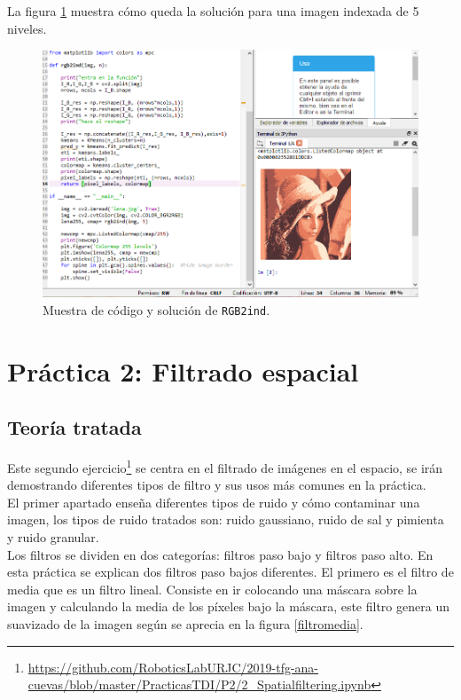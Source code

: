 La figura \ref{rgb2ind} muestra cómo queda la solución para una imagen indexada de 5 niveles.

\begin{figure}[h]
\centering
\includegraphics[width=1\textwidth]{imagenes/rgb2ind}
\caption{Muestra de código y solución de \texttt{RGB2ind}.}
\label{rgb2ind}
\end{figure}


\section{ Práctica 2: Filtrado espacial}

\subsection{Teoría tratada}

Este segundo ejercicio\footnote{\url{https://github.com/RoboticsLabURJC/2019-tfg-ana-cuevas/blob/master/PracticasTDI/P2/2_Spatialfiltering.ipynb}} se centra en el filtrado de imágenes en el espacio, se irán demostrando diferentes tipos de filtro y sus usos más comunes en la práctica.\\

El primer apartado enseña diferentes tipos de ruido y cómo contaminar una imagen, los tipos de ruido tratados son: ruido gaussiano, ruido de sal y pimienta y ruido granular.\\

Los filtros se dividen en dos categorías: filtros paso bajo y filtros paso alto. En esta práctica se explican dos filtros paso bajos diferentes. El primero es el filtro de media que es un filtro lineal. Consiste en ir colocando una máscara sobre la imagen y calculando la media de los píxeles bajo la máscara, este filtro genera un suavizado de la imagen según se aprecia en la figura \ref{filtromedia}.

